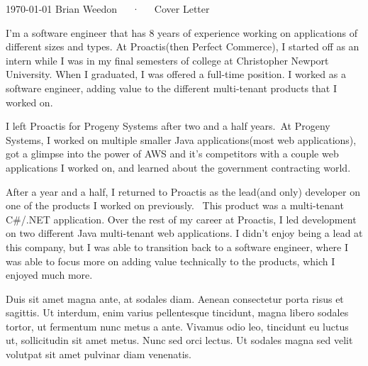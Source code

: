 \documentclass[11pt, a4paper]{awesome-cv}
\begin{document}
\makecvheader[C]

\makecvfooter
{\today}
{Brian Weedon~~~·~~~Cover Letter}
{}

\makelettertitle

\begin{cvletter}

    I'm a software engineer that has 8 years of experience working on applications of different sizes and types. At Proactis(then Perfect Commerce), I started off as an intern while I was in my final semesters of college at Christopher Newport University. When I graduated, I was offered a full-time position. I worked as a software engineer, adding value to the different multi-tenant products that I worked on. 

    I left Proactis for Progeny Systems after two and a half years. At Progeny Systems, I worked on multiple smaller Java applications(most web applications), got a glimpse into the power of AWS and it's competitors with a couple web applications I worked on, and learned about the government contracting world. 

    After a year and a half, I returned to Proactis as the lead(and only) developer on one of the products I worked on previously.  This product was a multi-tenant C\#/.NET application. Over the rest of my career at Proactis, I led development on two different Java multi-tenant web applications. I didn't enjoy being a lead at this company, but I was able to transition back to a software engineer, where I was able to focus more on adding value technically to the products, which I enjoyed much more.





    Duis sit amet magna ante, at sodales diam. Aenean consectetur porta risus et sagittis. Ut interdum, enim varius pellentesque tincidunt, magna libero sodales tortor, ut fermentum nunc metus a ante. Vivamus odio leo, tincidunt eu luctus ut, sollicitudin sit amet metus. Nunc sed orci lectus. Ut sodales magna sed velit volutpat sit amet pulvinar diam venenatis.

\end{cvletter}


\makeletterclosing
\end{document}

